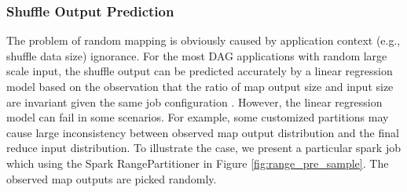 \subsubsection{Shuffle Output Prediction}\label{shuffleprediction}
{\color{blue}
The problem of random mapping is obviously caused by application context (e.g., shuffle data size) ignorance. 
For the most DAG applications with random large scale input, 
the shuffle output can be predicted accurately by a linear regression model based on the observation that the ratio of map output size and input size are invariant given the same job configuration \cite{guo2017ishuffle}.
However, the linear regression model can fail in some scenarios. 
For example, some customized partitions may cause large inconsistency between observed map output distribution and the final reduce input distribution. 
To illustrate the case, we present a particular spark job which using the Spark RangePartitioner in Figure \ref{fig:range_pre_sample}. 
The observed map outputs are picked randomly. 
}
